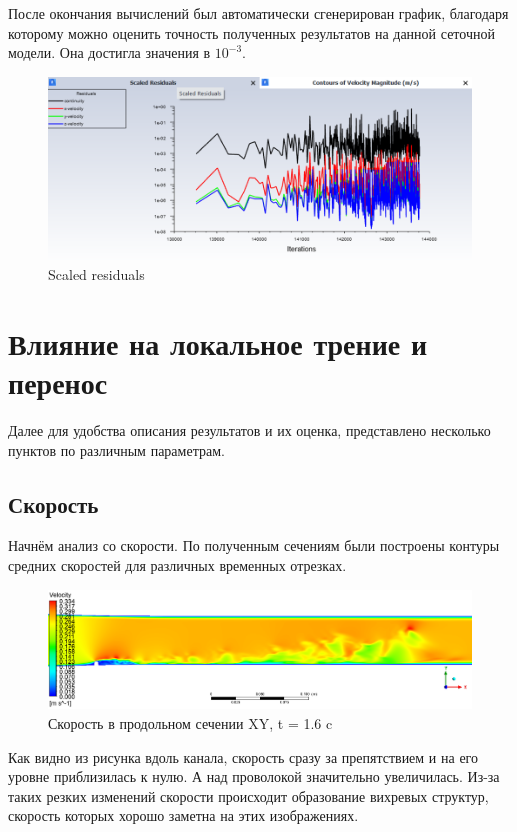 	После окончания вычислений был автоматически сгенерирован график, благодаря которому можно оценить точность полученных результатов на данной сеточной модели. Она достигла значения в $10^{-3}$.
	\begin{figure}[H]
		\centering
		\includegraphics[width=1\linewidth]{../Assets/scaledResiduals}
		\caption{Scaled residuals}
		\label{fig:scaledresiduals}
	\end{figure}
	
\section{Влияние на локальное трение и перенос}
	Далее для удобства описания результатов и их оценка, представлено несколько пунктов по различным параметрам.
\subsection{Скорость}
	Начнём анализ со скорости. По полученным сечениям были построены контуры средних скоростей для различных временных отрезках.
	\begin{figure}[H]
		\centering
		\includegraphics[width=1\linewidth]{../Assets/T16_Velocity_ContourXY}
		\caption{Скорость в продольном сечении XY, t = 1.6 c}
		\label{fig:t16velocitycontourxy}
	\end{figure}
	Как видно из рисунка вдоль канала, скорость сразу за препятствием и на его уровне приблизилась к нулю. А над проволокой значительно увеличилась. Из-за таких резких изменений скорости происходит образование вихревых структур, скорость которых хорошо заметна на этих изображениях.
	
